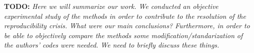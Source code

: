 \textbf{TODO: }
\textit{Here we will summarize our work. We conducted an objective experimental study of the methods in order to contribute to the resolution of the reproducibility crisis. What were our main conclusions? Furthermore, in order to be able to objectively compare the methods some modification/standarization of the authors' codes were needed. We need to briefly discuss these things.}
